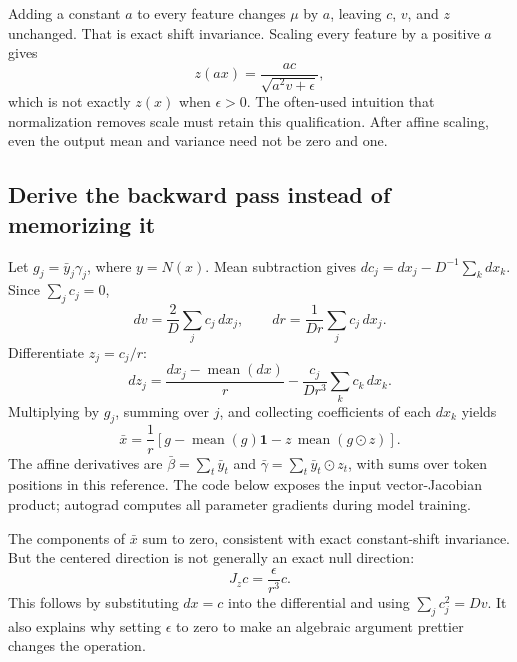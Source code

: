 
Adding a constant $a$ to every feature changes $\mu$ by $a$, leaving $c$, $v$, and $z$ unchanged. That is exact shift invariance. Scaling every feature by a positive $a$ gives
\begin{equation}
z(ax)=\frac{ac}{\sqrt{a^2v+\epsilon}},
\end{equation}
which is not exactly $z(x)$ when $\epsilon>0$. The often-used intuition that normalization removes scale must retain this qualification. After affine scaling, even the output mean and variance need not be zero and one.

\subsection{Derive the backward pass instead of memorizing it}
Let $g_j=\bar y_j\gamma_j$, where $y=N(x)$. Mean subtraction gives
$dc_j=dx_j-D^{-1}\sum_k dx_k$. Since $\sum_j c_j=0$,
\begin{equation}
dv=\frac2D\sum_j c_j\,dx_j,\qquad
dr=\frac{1}{Dr}\sum_j c_j\,dx_j.
\end{equation}
Differentiate $z_j=c_j/r$:
\begin{equation}
dz_j=\frac{dx_j-\operatorname{mean}(dx)}{r}
-\frac{c_j}{Dr^3}\sum_k c_k\,dx_k.
\end{equation}
Multiplying by $g_j$, summing over $j$, and collecting coefficients of each $dx_k$ yields
\begin{equation}
\bar x=\frac1r\left[g-\operatorname{mean}(g)\mathbf1
-z\,\operatorname{mean}(g\odot z)\right]. \label{eq:normgrad}
\end{equation}
The affine derivatives are $\bar\beta=\sum_t\bar y_t$ and
$\bar\gamma=\sum_t\bar y_t\odot z_t$, with sums over token positions in this reference. The code below exposes the input vector-Jacobian product; autograd computes all parameter gradients during model training.

The components of $\bar x$ sum to zero, consistent with exact constant-shift invariance. But the centered direction is not generally an exact null direction:
\begin{equation}
J_zc=\frac{\epsilon}{r^3}c.
\end{equation}
This follows by substituting $dx=c$ into the differential and using $\sum_j c_j^2=Dv$. It also explains why setting $\epsilon$ to zero to make an algebraic argument prettier changes the operation.

